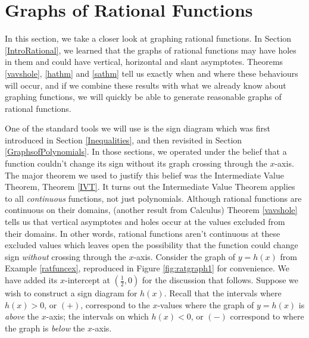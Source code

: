 \section{Graphs of Rational Functions}

\label{RationalGraphs}

In this section, we take a closer look at graphing rational functions.  In Section \ref{IntroRational}, we learned that the graphs of rational functions may have holes in them and could have vertical, horizontal and slant asymptotes.  Theorems \ref{vavshole}, \ref{hathm} and \ref{sathm} tell us exactly when and where these behaviours will occur, and if we combine these results with what we already know about graphing functions, we will quickly be able to generate reasonable graphs of rational functions.  

\smallskip

One of the standard tools we will use is the sign diagram which was first introduced in Section \ref{Inequalities}, and then revisited in Section \ref{GraphsofPolynomials}.  In those sections, we operated under the belief that a function couldn't change its sign without its graph crossing through the $x$-axis.  The major theorem we used to justify this belief was the Intermediate Value Theorem, Theorem \ref{IVT}.   It turns out the Intermediate Value Theorem applies to all \textit{continuous} functions,  not just polynomials.  Although rational functions are continuous on their domains, (another result from Calculus) Theorem \ref{vavshole} tells us that vertical asymptotes and holes occur at the values excluded from their domains.  In other words, rational functions aren't continuous at these excluded values which leaves open the possibility that the function could change sign \textit{without} crossing through the $x$-axis.  Consider the graph of $y=h(x)$ from Example \ref{ratfuncex}, reproduced in Figure \ref{fig:ratgraph1} for convenience.  We have added its $x$-intercept at $\left(\frac{1}{2},0\right)$ for the discussion that follows. Suppose we wish to construct a sign diagram for $h(x)$.    Recall that the intervals where $h(x)>0$, or $(+)$, correspond to the $x$-values where the graph of $y=h(x)$ is \textit{above} the $x$-axis; the intervals on which $h(x) < 0$, or $(-)$ correspond to where the graph is \textit{below} the $x$-axis.  


